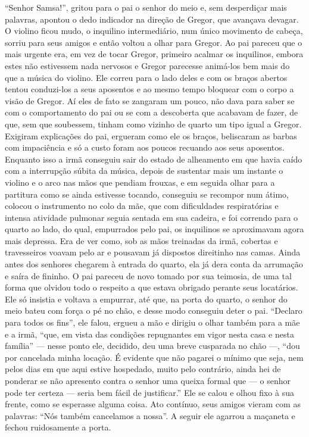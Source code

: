 “Senhor Samsa!”, gritou para o pai o senhor do meio e, sem desperdiçar
mais palavras, apontou o dedo indicador na direção de Gregor, que avançava
devagar. O violino ficou mudo, o inquilino intermediário, num único
movimento de cabeça, sorriu para seus amigos e então voltou a olhar para
Gregor. Ao pai pareceu que o mais urgente era, em vez de tocar Gregor,
primeiro acalmar os inquilinos, embora estes não estivessem nada nervosos
e Gregor parecesse animá-los bem mais do que a música do violino. Ele
correu para o lado deles e com os braços abertos tentou conduzi-los a seus
aposentos e ao mesmo tempo bloquear com o corpo a visão de Gregor. Aí eles
de fato se zangaram um pouco, não dava para saber se com o comportamento
do pai ou se com a descoberta que acabavam de fazer, de que, sem que
soubessem, tinham como vizinho de quarto um tipo igual a Gregor. Exigiram
explicações do pai, ergueram como ele os braços, beliscaram as barbas com
impaciência e só a custo foram aos poucos recuando aos seus aposentos.
Enquanto isso a irmã conseguiu sair do estado de alheamento em que havia
caído com a interrupção súbita da música, depois de sustentar mais um
instante o violino e o arco nas mãos que pendiam frouxas, e em seguida
olhar para a partitura como se ainda estivesse tocando, conseguiu se recompor
num átimo, colocou o instrumento no colo da mãe, que com dificuldades
respiratórias e intensa atividade pulmonar seguia sentada em sua cadeira,
e foi correndo para o quarto ao lado, do qual, empurrados pelo pai, os
inquilinos se aproximavam agora mais depressa. Era de ver como, sob as
mãos treinadas da irmã, cobertas e travesseiros voavam pelo ar e pousavam
já dispostos direitinho nas camas. Ainda antes dos senhores chegarem à
entrada do quarto, ela já dera conta da arrumação e saíra de fininho. O
pai pareceu de novo tomado por sua teimosia, de uma tal forma que olvidou
todo o respeito a que estava obrigado perante seus locatários. Ele só
insistia e voltava a empurrar, até que, na porta do quarto, o senhor do
meio bateu com força o pé no chão, e desse modo conseguiu deter o pai.
“Declaro para todos os fins”, ele falou, ergueu a mão e dirigiu o olhar
também para a mãe e a irmã, “que, em vista das condições repugnantes em
vigor nesta casa e nesta família” --- nesse ponto ele, decidido, deu uma
breve cusparada no chão ---, “dou por cancelada minha locação. É evidente
que não pagarei o mínimo que seja, nem pelos dias em que aqui estive
hospedado, muito pelo contrário, ainda hei de ponderar se não apresento
contra o senhor uma queixa formal que --- o senhor pode ter certeza --- seria
bem fácil de justificar.” Ele se calou e olhou fixo à sua frente, como se
esperasse alguma coisa. Ato contínuo, seus amigos vieram com as palavras:
“Nós também cancelamos a nossa”. A seguir ele agarrou a maçaneta e fechou
ruidosamente a porta.

